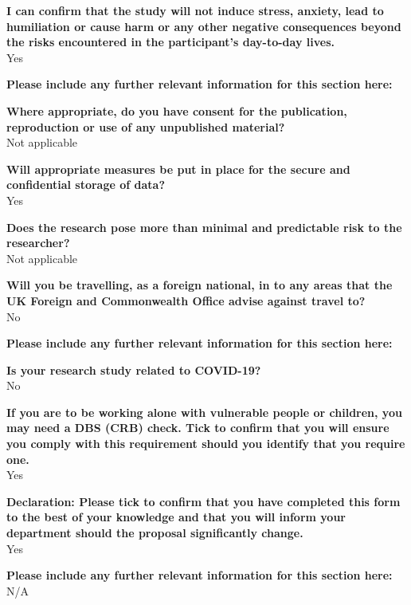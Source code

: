 \textbf{I can confirm that the study will not induce stress, anxiety, lead to humiliation or cause harm or any other negative consequences beyond the risks encountered in the participant’s day-to-day lives.}\\
Yes

\textbf{Please include any further relevant information for this section here:}

\textbf{Where appropriate, do you have consent for the publication, reproduction or use of any unpublished material?}\\
Not applicable

\textbf{Will appropriate measures be put in place for the secure and confidential storage of data?}\\
Yes

\textbf{Does the research pose more than minimal and predictable risk to the researcher?}\\
Not applicable

\textbf{Will you be travelling, as a foreign national, in to any areas that the UK Foreign and Commonwealth Office advise against travel to?}\\
No

\textbf{Please include any further relevant information for this section here:}

\textbf{Is your research study related to COVID-19?}\\
No

\textbf{If you are to be working alone with vulnerable people or children, you may need a DBS (CRB) check. Tick to confirm that you will ensure you comply with this requirement should you identify that you require one.}\\
Yes

\textbf{Declaration: Please tick to confirm that you have completed this form to the best of your knowledge and that you will inform your department should the proposal significantly change.}\\
Yes

\textbf{Please include any further relevant information for this section here:}\\
N/A